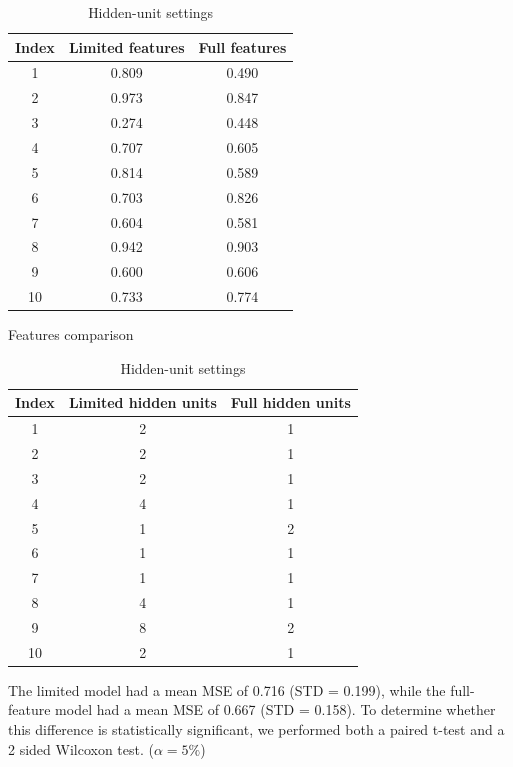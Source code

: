 \documentclass[12pt]{article}
\begin{document}
\begin{table}[ht]
\centering
\begin{minipage}[t]{0.49\textwidth}
  \centering
  \begin{tabular}{c c c}
    \hline
    Index & Limited features & Full features \\
    \hline
    1  & 0.809 & 0.490 \\
    2  & 0.973 & 0.847 \\
    3  & 0.274 & 0.448 \\
    4  & 0.707 & 0.605 \\
    5  & 0.814 & 0.589 \\
    6  & 0.703 & 0.826 \\
    7  & 0.604 & 0.581 \\
    8  & 0.942 & 0.903 \\
    9  & 0.600 & 0.606 \\
    10 & 0.733 & 0.774 \\
    \hline
  \end{tabular}
  \caption{Features comparison}
  \label{tab:features}
\end{minipage}
\hfill
\begin{minipage}[t]{0.50\textwidth}
  \centering
  \begin{tabular}{c c c}
    \hline
    Index & Limited hidden units & Full hidden units \\
    \hline
    1  & 2 & 1 \\
    2  & 2 & 1 \\
    3  & 2 & 1 \\
    4  & 4 & 1 \\
    5  & 1 & 2 \\
    6  & 1 & 1 \\
    7  & 1 & 1 \\
    8  & 4 & 1 \\
    9  & 8 & 2 \\
    10 & 2 & 1 \\
    \hline
  \end{tabular}
  \caption{Hidden-unit settings}
  \label{tab:hidden}
\end{minipage}
\end{table}

The limited model had a mean MSE of 0.716 (STD = 0.199), while the full-feature model had a mean MSE of 0.667 (STD = 0.158).
To determine whether this difference is statistically significant, we performed both a paired t-test and a 2 sided Wilcoxon test. ($\alpha=5\%$)
\end{document}
